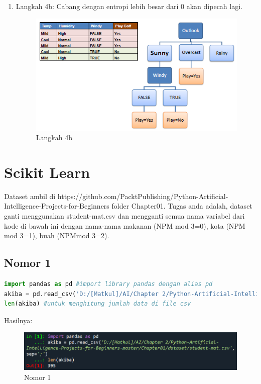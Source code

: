 \begin{enumerate}
\begin{figure}[H]
        \caption{Langkah 4a}
    \end{figure}
    \item Langkah 4b: Cabang dengan entropi lebih besar dari 0 akan dipecah lagi.
    \begin{figure}[H]
        \centering
        \includegraphics[width=12cm]{figures/chapter2/18.png}
        \caption{Langkah 4b}
    \end{figure}
\end{enumerate}

\section{Scikit Learn}

\par Dataset ambil di https://github.com/PacktPublishing/Python-Artificial-Intelligence-Projects-for-Beginners folder Chapter01. Tugas anda adalah, dataset ganti menggunakan student-mat.csv dan mengganti semua nama variabel dari kode di bawah ini dengan nama-nama makanan (NPM mod 3=0), kota (NPM mod 3=1), buah (NPMmod 3=2).

\subsection{Nomor 1}
\begin{lstlisting}[language=Python]
import pandas as pd #import library pandas dengan alias pd
akiba = pd.read_csv('D:/[Matkul]/AI/Chapter 2/Python-Artificial-Intelligence-Projects-for-Beginners-master/Chapter01/dataset/student-mat.csv', sep=';') #sebuah variable akiba untuk memanggil file csv
len(akiba) #untuk menghitung jumlah data di file csv
\end{lstlisting}

\par Hasilnya:

\begin{figure}[H]
    \centering
    \includegraphics[width=12cm]{figures/chapter2/19.PNG}
    \caption{Nomor 1}
\end{figure}

